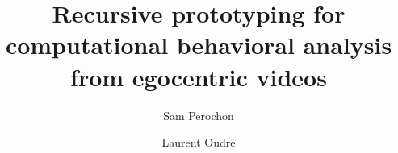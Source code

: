 \documentclass[runningheads]{llncs}
\begin{document}


\title{Recursive prototyping for computational behavioral analysis from egocentric videos}


%
\author{Sam Perochon \and
Laurent Oudre}

\end{document}
